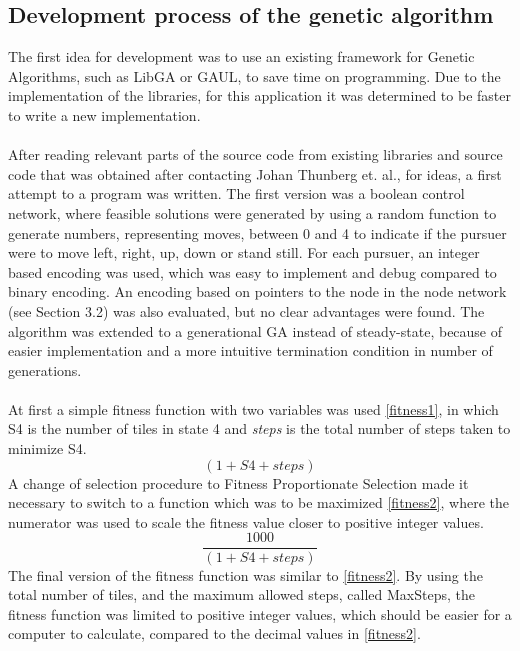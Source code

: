 \subsection{Development process of the genetic algorithm}
The first idea for development was to use an existing framework for Genetic Algorithms, such as LibGA \cite{libGA} or GAUL\cite{GAUL}, to save time on programming. Due to the implementation of the libraries, for this application it was determined to be faster to write a new implementation.\\\\
%
After reading relevant parts of the source code from existing libraries and source code that was obtained after contacting Johan Thunberg et. al., for ideas, a first attempt to a program was written. The first version was a boolean control network, where feasible solutions were generated by using a random function to generate numbers, representing moves, between 0 and 4 to indicate if the pursuer were to move left, right, up, down or stand still. For each pursuer, an integer based encoding was used, which was easy to implement and debug compared to binary encoding. An encoding based on pointers to the node in the node network (see Section 3.2) was also evaluated, but no clear advantages were found. The algorithm was extended to a generational GA instead of steady-state, because of easier implementation and a more intuitive termination condition in number of generations.\\\\
At first a simple fitness function with two variables was used \eqref{fitness1}, in which S4 is the number of tiles in state 4 and \textit{steps} is the total number of steps taken to minimize S4.
%
\begin{equation}\label{fitness1} (1+S4+steps) \end{equation}
%
A change of selection procedure to Fitness Proportionate Selection made it necessary to switch to a function which was to be maximized \eqref{fitness2},  where the numerator was used to scale the fitness value closer to positive integer values.
%
\begin{equation}\label{fitness2} \frac{1000}{(1+S4+steps)} \end{equation}
%
The final version of the fitness function was similar to \eqref{fitness2}. By using the total number of tiles, and the maximum allowed steps, called MaxSteps, the fitness function was limited to positive integer values, which should be easier for a computer to calculate, compared to the decimal values in \eqref{fitness2}.
